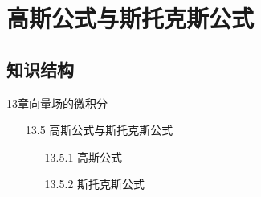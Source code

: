 \documentclass[12pt,UTF8]{ctexart}
\begin{document}
\setcounter{section}{23}
\section{高斯公式与斯托克斯公式}
\subsection{知识结构}
13章向量场的微积分
	\begin{enumerate}
		\item[13.5]高斯公式与斯托克斯公式
			\begin{enumerate}
				\item[13.5.1]高斯公式
				\item[13.5.2]斯托克斯公式
			\end{enumerate}
	\end{enumerate}
\end{document}
